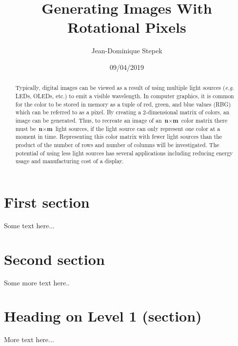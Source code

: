 \documentclass[12pt]{report}
\title{Generating Images With Rotational Pixels}
\author{Jean-Dominique Stepek}
\date{09/04/2019}
\begin{document}
\maketitle
\begin{abstract}
Typically, digital images can be viewed as a result of using multiple light sources (\textit{e.g.} LEDs, OLEDs, etc.) to emit a visible wavelength. In computer graphics, it is common for the color to be stored in memory as a tuple of red, green, and blue values (RBG) which can be referred to as a pixel. By creating a 2-dimensional matrix of colors, an image can be generated. Thus, to recreate an image of an \(\textbf{n}\times\textbf{m}\) color matrix there must be \(\textbf{n}\times\textbf{m}\) light sources, if the light source can only represent one color at a moment in time. Representing this color matrix with fewer light sources than the product of the number of rows and number of columns will be investigated. The potential of using less light sources has several applications including reducing energy usage and manufacturing cost of a display. 
\end{abstract}

\tableofcontents
 
\section{First section}
\setcounter{page}{3}
 
Some text here...
 
\section{Second section}
Some more text here..
 
\section{Heading on Level 1 (section)}
 
More text here...
\end{document}
